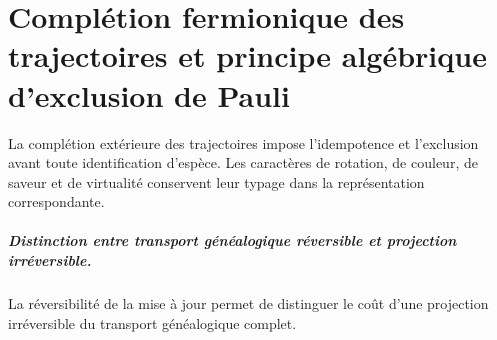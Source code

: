 \chapter{Complétion fermionique des trajectoires et principe algébrique d’exclusion de Pauli}
\label{chap:parte-iv-56}

La complétion extérieure des trajectoires impose l’idempotence et l’exclusion avant toute identification d’espèce. Les caractères de rotation, de couleur, de saveur et de virtualité conservent leur typage dans la représentation correspondante.





\paragraph{Distinction entre transport généalogique réversible et projection irréversible.} La réversibilité de la mise à jour permet de distinguer le coût d’une projection irréversible du transport généalogique complet.
